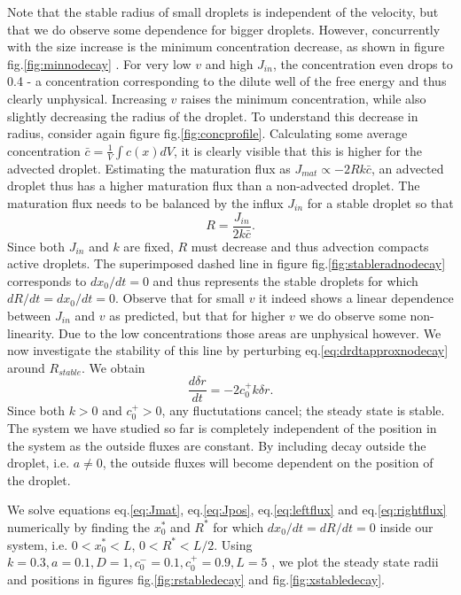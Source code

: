 \documentclass{Dissertate}
\begin{document}
Note that the stable radius of small droplets is independent of the
velocity, but that we do observe some dependence for bigger droplets.
However, concurrently with the size increase is the minimum
concentration decrease, as shown in figure fig.\ref{fig:minnodecay} .
For very low \(v\) and high \(J_{in}\), the concentration even drops to
0.4 - a concentration corresponding to the dilute well of the free
energy and thus clearly unphysical. Increasing \(v\) raises the minimum
concentration, while also slightly decreasing the radius of the droplet.
To understand this decrease in radius, consider again figure
fig.\ref{fig:concprofile}. Calculating some average concentration
\(\bar{c}=\frac{1}{V}\int c(x)dV\), it is clearly visible that this is
higher for the advected droplet. Estimating the maturation flux as
\(J_{mat}\propto -2Rk\bar{c}\), an advected droplet thus has a higher
maturation flux than a non-advected droplet. The maturation flux needs
to be balanced by the influx \(J_{in}\) for a stable droplet so that
\begin{equation}
R = \frac{J_{in}}{2k\bar{c}}.
\label{eq:jmathandwavy}\end{equation} Since both \(J_{in}\) and \(k\)
are fixed, \(R\) must decrease and thus advection compacts active
droplets. The superimposed dashed line in figure
fig.\ref{fig:stableradnodecay} corresponds to \(dx_0/dt=0\) and thus
represents the stable droplets for which \(dR/dt=dx_0/dt=0\). Observe
that for small \(v\) it indeed shows a linear dependence between
\(J_{in}\) and \(v\) as predicted, but that for higher \(v\) we do
observe some non-linearity. Due to the low concentrations those areas
are unphysical however. We now investigate the stability of this line by
perturbing eq.\ref{eq:drdtapproxnodecay} around \(R_{stable}\). We
obtain \[
\frac{d\delta r}{dt}=-2c_0^+k\delta r.
\] Since both \(k>0\) and \(c_0^+>0\), any fluctutations cancel; the
steady state is stable. The system we have studied so far is completely
independent of the position in the system as the outside fluxes are
constant. By including decay outside the droplet, i.e. \(a\neq 0\), the
outside fluxes will become dependent on the position of the droplet.

We solve equations eq.\ref{eq:Jmat}, eq.\ref{eq:Jpos},
eq.\ref{eq:leftflux} and eq.\ref{eq:rightflux} numerically by finding
the \(x_0^*\) and \(R^{*}\) for which \(dx_0/dt=dR/dt=0\) inside our
system, i.e. \(0<x_0^*<L\), \(0<R^*<L/2\). Using
\(k=0.3, a=0.1, D=1 ,c_0^-=0.1,c_0^+=0.9, L=5\) , we plot the steady
state radii and positions in figures fig.\ref{fig:rstabledecay} and
fig.\ref{fig:xstabledecay}.
\end{document}
